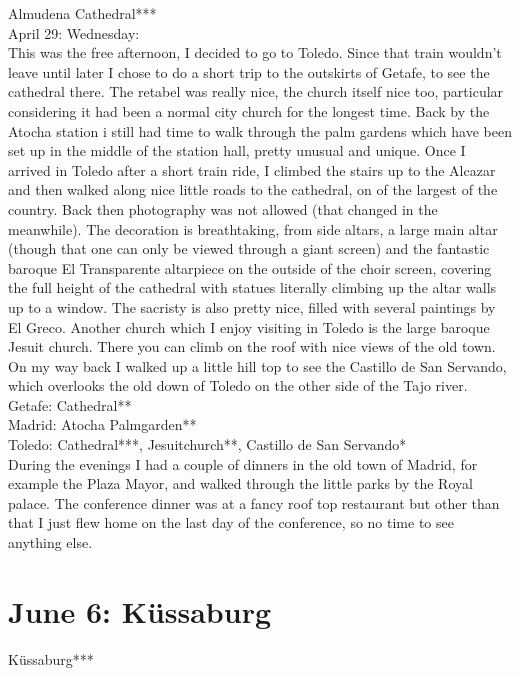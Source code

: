 Almudena Cathedral***\\

April 29: Wednesday:\\
This was the free afternoon, I decided to go to Toledo. Since that train wouldn't leave until later I chose to do a short trip to the outskirts of Getafe, to see the cathedral there. The retabel was really nice, the church itself nice too, particular considering it had been a normal city church for the longest time. Back by the Atocha station i still had time to walk through the palm gardens which have been set up in the middle of the station hall, pretty unusual and unique. Once I arrived in Toledo after a short train ride, I climbed the stairs up to the Alcazar and then walked along nice little roads to the cathedral, on of the largest of the country. Back then photography was not allowed (that changed in the meanwhile). The decoration is breathtaking, from side altars, a large main altar (though that one can only be viewed through a giant screen) and the fantastic baroque El Transparente altarpiece on the outside of the choir screen, covering the full height of the cathedral with statues literally climbing up the altar walls up to a window. The sacristy is also pretty nice, filled with several paintings by El Greco. Another church which I enjoy visiting in Toledo is the large baroque Jesuit church. There you can climb on the roof with nice views of the old town. On my way back I walked up a little hill top to see the Castillo de San Servando, which overlooks the old down of Toledo on the other side of the Tajo river.\\

Getafe: Cathedral**\\
Madrid: Atocha Palmgarden**\\
Toledo: Cathedral***, Jesuitchurch**, Castillo de San Servando*\\

During the evenings I had a couple of dinners in the old town of Madrid, for example the Plaza Mayor, and walked through the little parks by the Royal palace. The conference dinner was at a fancy roof top restaurant but other than that I just flew home on the last day of the conference, so no time to see anything else.

\section{June 6: K\"ussaburg}
\label{2009:Kuessaburg}

K\"ussaburg***


